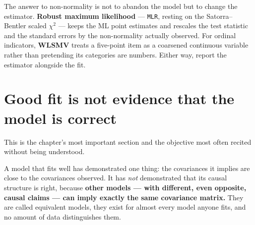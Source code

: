 \documentclass[
  letterpaper,
  10pt,
  twoside,
  openright,
  numbers=noenddot,
  chapterprefix=true]{scrbook}
\begin{document}
The answer to non-normality is not to abandon the model but to change
the estimator. \textbf{Robust maximum likelihood} --- \texttt{MLR},
resting on the Satorra--Bentler scaled \(\chi^2\) --- keeps the ML point
estimates and rescales the test statistic and the standard errors by the
non-normality actually observed. For ordinal indicators, \textbf{WLSMV}
treats a five-point item as a coarsened continuous variable rather than
pretending its categories are numbers. Either way, report the estimator
alongside the fit.

\section{Good fit is not evidence that the model is
correct}\label{good-fit-is-not-evidence-that-the-model-is-correct}

This is the chapter's most important section and the objective most
often recited without being understood.

A model that fits well has demonstrated one thing: the covariances it
implies are close to the covariances observed. It has \emph{not}
demonstrated that its causal structure is right, because \textbf{other
models --- with different, even opposite, causal claims --- can imply
exactly the same covariance matrix.} They are called equivalent models,
they exist for almost every model anyone fits, and no amount of data
distinguishes them.
\end{document}
